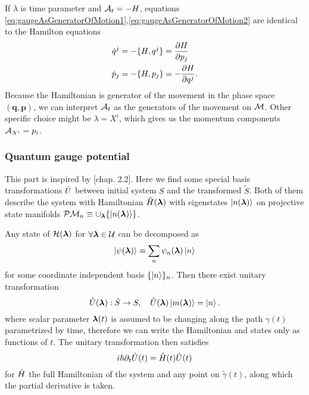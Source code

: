 If $\lambda$ is time parameter and $\mathcal{A}_t=-H$, equations \ref{eq:gaugeAsGeneratorOfMotion1},\ref{eq:gaugeAsGeneratorOfMotion2} are identical to the Hamilton equations
\begin{equation}
\begin{split}
    \dot{q}^j&=-\{H,q^j\} = \frac{\partial H}{\partial p_j}\\
    \dot{p}_j&=-\{H,p_j\} = -\frac{\partial H}{\partial q^j}.
\end{split}
\end{equation}
Because the Hamiltonian is generator of the movement in the phase space $(\bm{q},\bm{p})$, we can interpret $\mathcal{A}_t$ as the generators of the movement on $\mathcal{M}$. Other specific choice might be $\lambda=X^i$, which gives us the momentum components $\mathcal{A}_{X^i}=p_i$.



\subsubsection{Quantum gauge potential}
This part is inspired by \citet{kolodrubez}[chap. 2.2].
Here we find some special basis transformations $\hat{U}$ between initial system $S$ and the transformed $\tilde{S}$. Both of them describe the system with Hamiltonian $\hat{H}({\bm\lambda})$ with eigenstates $\ket{n({\bm\lambda})}$ on projective state manifolds $\mathcal{P}\mathcal{M}_n\equiv \cup_{\bm\lambda} \{\ket{n({\bm\lambda})}\}$. 

Any state of $\mathcal{H}({\bm\lambda})$ for $\forall {\bm\lambda}\in \mathcal U$ can be decomposed as
    \begin{equation}
    \ket{\psi({\bm\lambda})}\equiv \sum_n \psi_n({\bm\lambda})\ket{n}
\end{equation}    
for some coordinate independent basis $\{\ket{n}\}_n$.
Then there exist unitary transformation
\begin{equation}
    \hat{U}({\bm\lambda}): \tilde S\rightarrow S,\quad \hat{U}({\bm\lambda})\ket{m({\bm\lambda})}=\ket{n}.
    \label{eq:transformationU}
\end{equation}
where scalar parameter ${\bm\lambda}(t)$ is assumed to be changing along the path $\gamma(t)$ parametrized by time, therefore we can write the Hamiltonian and states only as functions of $t$. The unitary transformation then satisfies
\begin{equation}
    i\hbar \partial_t \hat{U}(t)=\hat{H}(t)\hat{U}(t)
    \label{eq:schrodingerForU}
\end{equation}
for $\hat{H}$ the full Hamiltonian of the system and any point on $\tilde\gamma(t)$, along which the partial derivative is taken.


